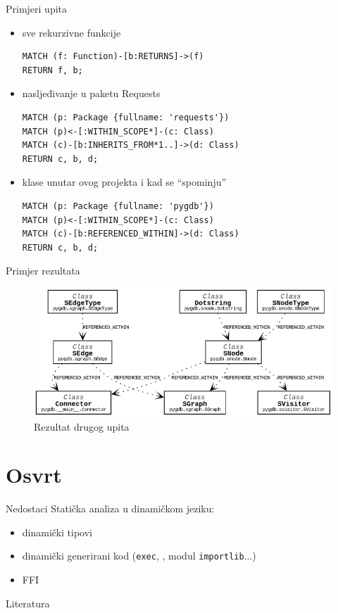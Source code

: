 \documentclass{beamer}
\begin{document}
\begin{frame}[fragile]{Primjeri upita}

\begin{itemize}
\item sve rekurzivne funkcije
\begin{lstlisting}
MATCH (f: Function)-[b:RETURNS]->(f)
RETURN f, b;
\end{lstlisting}

\item nasljeđivanje u paketu Requests
\begin{lstlisting}
MATCH (p: Package {fullname: 'requests'})
MATCH (p)<-[:WITHIN_SCOPE*]-(c: Class)
MATCH (c)-[b:INHERITS_FROM*1..]->(d: Class)
RETURN c, b, d;
\end{lstlisting}

\item klase unutar ovog projekta i kad se \enquote{spominju}
\begin{lstlisting}
MATCH (p: Package {fullname: 'pygdb'})
MATCH (p)<-[:WITHIN_SCOPE*]-(c: Class)
MATCH (c)-[b:REFERENCED_WITHIN]->(d: Class)
RETURN c, b, d;
\end{lstlisting}

\end{itemize}
\end{frame}

\begin{frame}{Primjer rezultata}
\begin{figure}
\includegraphics[scale=0.5]{assets/klref.png}
\centering
\caption{Rezultat drugog upita}
\label{fig:2}
\end{figure}
\end{frame}

\section{Osvrt}
\begin{frame}[fragile]{Nedostaci}
Statička analiza u dinamičkom jeziku:
\begin{itemize}

\item dinamički tipovi
\item dinamički generirani kod (\texttt{exec}, , modul \texttt{importlib}...)
\item FFI
\end{itemize}

\end{frame}

\begin{frame}[t]{Literatura}
\printbibliography
\end{frame}
\end{document}
